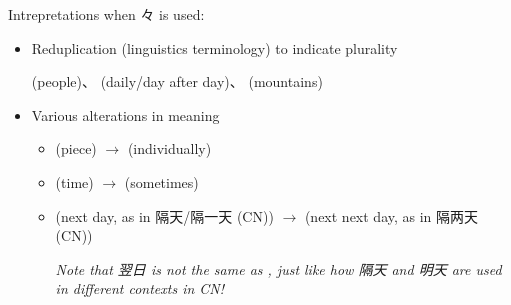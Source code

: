 \documentclass[../nihongo-gakushuu-kyouzai.tex]{subfiles}
\begin{document}
Intrepretations when 々 is used:
\begin{itemize}
    \item Reduplication (linguistics terminology) to indicate plurality

     (people)、 (daily/day after day)、 (mountains)
    \item Various alterations in meaning
    \begin{itemize}
        \item {} (piece) $\to$  (individually)
        \item {} (time) $\to$  (sometimes)
        \item {} (next day, as in 隔天/隔一天 (CN)) $\to$  (next next day, as in 隔两天 (CN))

        \emph{Note that 翌日 is not the same as , just like how 隔天 and 明天 are used in different contexts in CN!}
    \end{itemize}
\end{itemize}
\end{document}
